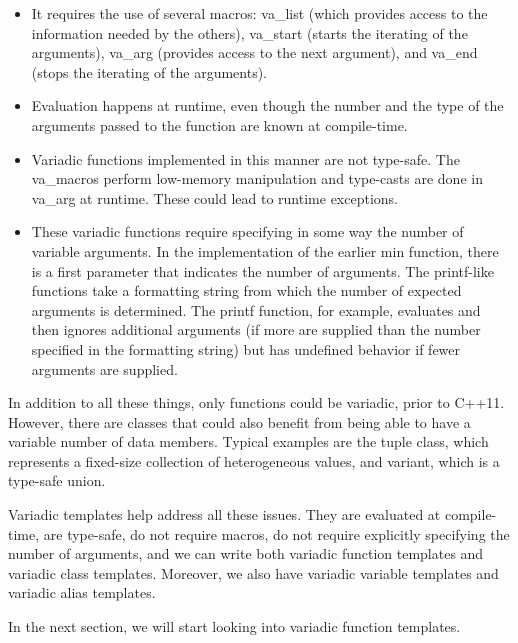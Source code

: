 \begin{itemize}
\item
It requires the use of several macros: va\_list (which provides access to the information needed by the others), va\_start (starts the iterating of the arguments), va\_arg (provides access to the next argument), and va\_end (stops the iterating of the arguments).

\item
Evaluation happens at runtime, even though the number and the type of the arguments passed to the function are known at compile-time.

\item
Variadic functions implemented in this manner are not type-safe. The va\_macros perform low-memory manipulation and type-casts are done in va\_arg at runtime. These could lead to runtime exceptions.

\item
These variadic functions require specifying in some way the number of variable arguments. In the implementation of the earlier min function, there is a first parameter that indicates the number of arguments. The printf-like functions take a formatting string from which the number of expected arguments is determined. The printf function, for example, evaluates and then ignores additional arguments (if more are supplied than the number specified in the formatting string) but has undefined behavior if fewer arguments are supplied.
\end{itemize}

In addition to all these things, only functions could be variadic, prior to C++11. However, there are classes that could also benefit from being able to have a variable number of data members. Typical examples are the tuple class, which represents a fixed-size collection of heterogeneous values, and variant, which is a type-safe union.

Variadic templates help address all these issues. They are evaluated at compile-time, are type-safe, do not require macros, do not require explicitly specifying the number of arguments, and we can write both variadic function templates and variadic class templates. Moreover, we also have variadic variable templates and variadic alias templates.

In the next section, we will start looking into variadic function templates.






























